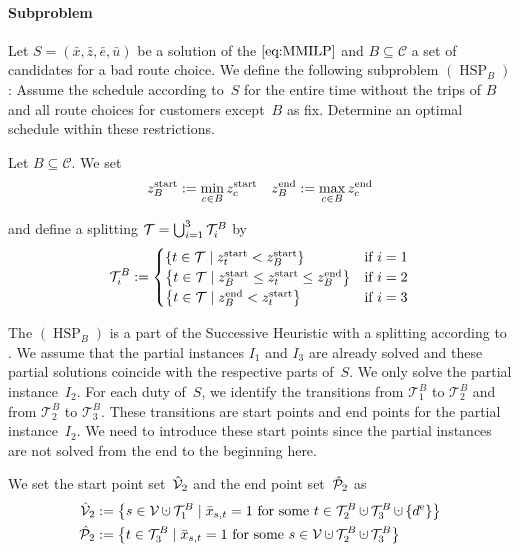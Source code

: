 \paragraph{Subproblem} \parfill

Let $S=\left(\bar{x},\bar{z},\bar{e},\bar{u}\right)$ be a solution of the $\eqref{eq:MMILP}$ and $B\subseteq\mathcal{C}$ a set of candidates for a bad route choice. We define the following subproblem $(\operatorname{HSP}_B)$: Assume the schedule according to~$S$ for the entire time without the trips of $B$ and all route choices for customers except~$B$ as fix. Determine an optimal schedule within these restrictions.

\begin{definition}
\label{def:splitting_HSP}

Let ${B\subseteq\mathcal{C}}$. We set
\begin{align*}
	z^{\operatorname{start}}_B := \min_{c\in B}z^{\operatorname{start}}_c && z^{\operatorname{end}}_B := \max_{c\in B}z^{\operatorname{end}}_c
\end{align*}

and define a splitting ${\mathcal{T}=\bigcup_{i=1}^3\mathcal{T}_i^B}$ by
\begin{align*}
	\mathcal{T}^B_i := \begin{cases}
		\left\{t\in\mathcal{T}\mid z^{\operatorname{start}}_t<z^{\operatorname{start}}_B\right\} & \text{if } i=1 \\
		\left\{t\in\mathcal{T}\mid z^{\operatorname{start}}_B\leq z^{\operatorname{start}}_t\leq z^{\operatorname{end}}_B\right\} & \text{if } i=2 \\
		\left\{t\in\mathcal{T}\mid z^{\operatorname{end}}_B<z^{\operatorname{start}}_t\right\} & \text{if } i=3
	\end{cases}
\end{align*}

\end{definition}

The $(\operatorname{HSP}_B)$ is a part of the Successive Heuristic with a splitting according to . We assume that the partial instances $I_1$ and $I_3$ are already solved and these partial solutions coincide with the respective parts of~$S$. We only solve the partial instance~$I_2$. For each duty of~$S$, we identify the transitions from $\mathcal{T}^B_1$ to $\mathcal{T}^B_2$ and from $\mathcal{T}^B_2$ to $\mathcal{T}^B_3$. These transitions are start points and end points for the partial instance~$I_2$. We need to introduce these start points since the partial instances are not solved from the end to the beginning here.

We set the start point set~$\hat{\mathcal{V}}_2$ and the end point set~$\hat{\mathcal{P}}_2$ as
\begin{align*}
	\Vhat_2 & := \left\{s\in\mathcal{V}\cupdot\mathcal{T}^B_1\mid\bar{x}_{s,t}=1\text{ for some } t\in\mathcal{T}^B_2\cupdot\mathcal{T}^B_3\cupdot\left\{\de\right\}\right\} \\
	\Phat_2 & := \left\{t\in\mathcal{T}^B_3\mid\bar{x}_{s,t}=1\text{ for some } s\in\mathcal{V}\cupdot\mathcal{T}^B_2\cupdot\mathcal{T}^B_3\right\}
\end{align*}

